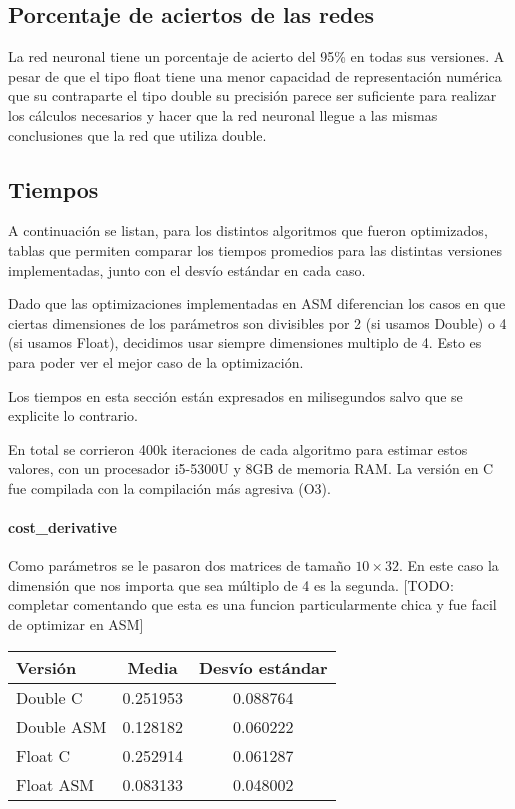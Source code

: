 \subsection{Porcentaje de aciertos de las redes}

La red neuronal tiene un porcentaje de acierto del 95\% en todas sus versiones. A pesar de que el tipo float tiene una menor capacidad de representación numérica que su contraparte el tipo double su precisión parece ser suficiente para realizar los cálculos necesarios y hacer que la red neuronal llegue a las mismas conclusiones que la red que utiliza double.

\subsection{Tiempos}

A continuación se listan, para los distintos algoritmos que fueron optimizados, tablas que permiten comparar los tiempos promedios para las distintas versiones implementadas, junto con el desvío estándar en cada caso.

Dado que las optimizaciones implementadas en ASM diferencian los casos en que ciertas dimensiones de los parámetros son divisibles por 2 (si usamos Double) o 4 (si usamos Float), decidimos usar siempre dimensiones multiplo de 4. Esto es para poder ver el mejor caso de la optimización.

Los tiempos en esta sección están expresados en milisegundos salvo que se explicite lo contrario.

En total se corrieron 400k iteraciones de cada algoritmo para estimar estos valores, con un procesador i5-5300U y 8GB de memoria RAM. La versión en C fue compilada con la compilación más agresiva (O3).

\paragraph{cost\_derivative}

Como parámetros se le pasaron dos matrices de tamaño $10\times32$. En este caso la dimensión que nos importa que sea múltiplo de 4 es la segunda. [TODO: completar comentando que esta es una funcion particularmente chica y fue facil de optimizar en ASM]

\begin{center}
    \begin{tabular}{| l | c | c |}
                \hline
    Versión & Media & Desvío estándar \\
                \hline
    Double C & 0.251953 & 0.088764 \\
    Double ASM & 0.128182 & 0.060222 \\
    Float C & 0.252914 & 0.061287 \\
    Float ASM  & 0.083133 & 0.048002 \\
                \hline
			
        \end{tabular}
\end{center}

